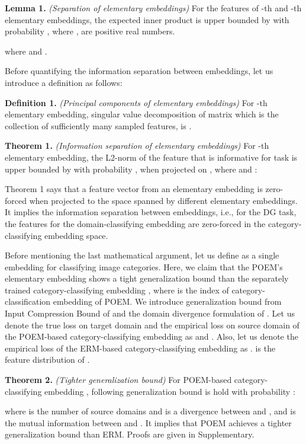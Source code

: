 \documentclass[letterpaper]{article} \usepackage{aaai23}  \usepackage{times}  \usepackage{helvet}  \usepackage{courier}  \usepackage[hyphens]{url}  \usepackage{graphicx} \urlstyle{rm} \def\UrlFont{\rm}  \usepackage{natbib}  \usepackage{caption} \frenchspacing  \setlength{\pdfpagewidth}{8.5in}  \setlength{\pdfpageheight}{11in}  \usepackage[labelsep=period]{caption}
\begin{document}
\textbf{Lemma 1.} \textit{(Separation of elementary embeddings)} For the features of -th and -th elementary embeddings, the expected inner product is upper bounded by  with probability , where ,  are positive real numbers.

where  and .

Before quantifying the information separation between embeddings, let us introduce a definition as follows:

\textbf{Definition 1.} \textit{(Principal components of elementary embeddings)} For -th elementary embedding, singular value decomposition of matrix  which is the collection of sufficiently many sampled features, is .

\textbf{Theorem 1.} \textit{(Information separation of elementary embeddings)} For -th elementary embedding, the L2-norm of the feature  that is informative for task  is upper bounded by  with probability , when projected on , where  and :


Theorem 1 says that a feature vector from an elementary embedding is zero-forced when projected to the space spanned by different elementary embeddings. It implies the information separation between embeddings, i.e., for the DG task, the features for the domain-classifying embedding are zero-forced in the category-classifying embedding space.

Before mentioning the last mathematical argument, let us define  as a single embedding for classifying image categories. 
Here, we claim that the POEM's elementary embedding  shows a tight generalization bound than the separately trained category-classifying embedding , where  is the index of category-classification embedding of POEM.
We introduce generalization bound from Input Compression Bound of \cite{IBN} and the domain divergence formulation of \cite{SWAD}.
Let us denote the true loss on target domain  and the empirical loss on source domain  of the POEM-based category-classifying embedding as  and . 
Also, let us denote the empirical loss of the ERM-based category-classifying embedding  as .  is the feature distribution of .

\textbf{Theorem 2.} \textit{(Tighter generalization bound)} For POEM-based category-classifying embedding , following generalization bound is hold with probability :

where  is the number of source domains and  is a divergence between  and , and  is the mutual information between  and . It implies that POEM achieves a tighter generalization bound than ERM. Proofs are given in Supplementary.
\end{document}
